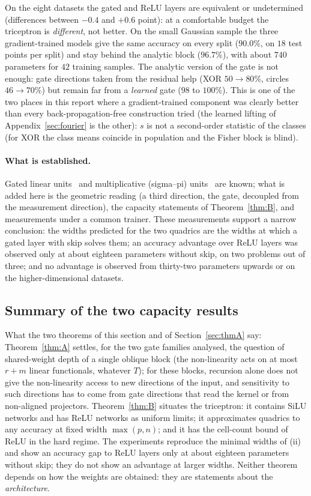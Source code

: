 \documentclass[11pt,a4paper]{article}
\theoremstyle{plain}
\theoremstyle{definition}
\theoremstyle{remark}
\begin{document}
On the eight datasets the gated and ReLU layers are equivalent or
undetermined (differences between $-0.4$ and $+0.6$ point): at a
comfortable budget the triceptron is \emph{different}, not better. On the
small Gaussian sample the three gradient-trained models give the same
accuracy on every split ($90.0\%$, on $18$ test points per split) and stay
behind the analytic block ($96.7\%$), with about $740$ parameters for
$42$ training samples. The analytic version of the gate is not enough:
gate directions taken from the residual help (XOR $50\to80\%$, circles
$46\to70\%$) but remain far from a \emph{learned} gate ($98$ to $100\%$).
This is one of the two places in this report where a gradient-trained
component was clearly better than every back-propagation-free construction
tried (the learned lifting of Appendix~\ref{sec:fourier} is the other):
$s$ is not a second-order statistic of the classes (for XOR the class
means coincide in population and the Fisher block is blind).

\paragraph{What is established.} Gated linear
units~\cite{dauphin2017glu,shazeer2020glu} and multiplicative (sigma--pi)
units~\cite{rumelhart1986} are known; what is added here is the geometric
reading (a third direction, the gate, decoupled from the measurement
direction), the capacity statements of Theorem~\ref{thm:B}, and
measurements under a common trainer. These measurements support a narrow
conclusion: the widths predicted for the two quadrics are the widths at
which a gated layer with skip solves them; an accuracy advantage over ReLU
layers was observed only at about eighteen parameters without skip, on two
problems out of three; and no advantage is observed from thirty-two
parameters upwards or on the higher-dimensional datasets.

\subsection{Summary of the two capacity results}
What the two theorems of this section and of Section~\ref{sec:thmA} say:
Theorem~\ref{thm:A} settles, for the two gate families analysed, the
question of shared-weight depth of a single oblique block (the
non-linearity acts on at most $r+m$ linear functionals, whatever $T$); for
these blocks, recursion alone does not give the non-linearity access to
new directions of the input, and sensitivity to such directions has to come
from gate directions that read the kernel or from non-aligned projectors. Theorem~\ref{thm:B} situates the
triceptron: it contains SiLU networks and has ReLU networks as uniform
limits; it approximates quadrics to any accuracy at fixed width
$\max(p,n)$; and it has the cell-count bound of ReLU in the hard regime.
The experiments reproduce the minimal widths of (ii) and show an accuracy
gap to ReLU layers only at about eighteen parameters without skip; they do
not show an advantage at larger widths. Neither theorem depends on how the
weights are obtained: they are statements about the \emph{architecture}.
\end{document}
